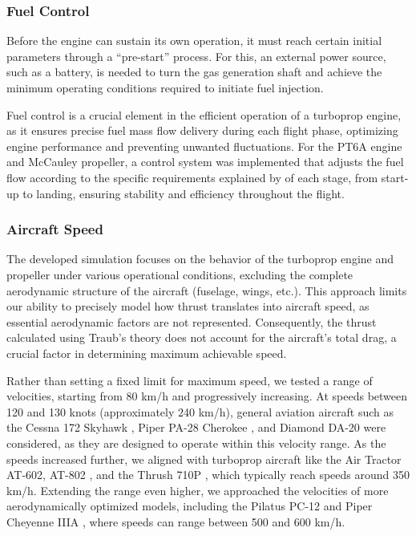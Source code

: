 \documentclass{Format}
\begin{document}
\subsubsection{Fuel Control}
    Before the engine can sustain its own operation, it must reach certain initial parameters through a “pre-start” process. For this, an external power source, such as a battery, is needed to turn the gas generation shaft and achieve the minimum operating conditions required to initiate fuel injection.
    
    Fuel control is a crucial element in the efficient operation of a turboprop engine, as it ensures precise fuel mass flow delivery during each flight phase, optimizing engine performance and preventing unwanted fluctuations. For the PT6A  engine and McCauley propeller, a control system was implemented that adjusts the fuel flow according to the specific requirements explained by \cite{vecchiio2024} of each stage, from start-up to landing, ensuring stability and efficiency throughout the flight.

\subsubsection{Aircraft Speed}
The developed simulation focuses on the behavior of the turboprop engine and propeller under various operational conditions, excluding the complete aerodynamic structure of the aircraft (fuselage, wings, etc.). This approach limits our ability to precisely model how thrust translates into aircraft speed, as essential aerodynamic factors are not represented. Consequently, the thrust calculated using Traub’s theory \cite{traub2016} does not account for the aircraft’s total drag, a crucial factor in determining maximum achievable speed.

Rather than setting a fixed limit for maximum speed, we tested a range of velocities, starting from 80 km/h and progressively increasing. At speeds between 120 and 130 knots (approximately 240 km/h), general aviation aircraft such as the Cessna 172 Skyhawk \cite{cessna_skyhawk_2024}, Piper PA-28 Cherokee \cite{piper_cherokee_2021}, and Diamond DA-20 \cite{diamond_da20_2024} were considered, as they are designed to operate within this velocity range. As the speeds increased further, we aligned with turboprop aircraft like the Air Tractor AT-602, AT-802 \cite{airtractor6022024,airtractor802a2024}, and the Thrush 710P \cite{thrush710p2024}, which typically reach speeds around 350 km/h. Extending the range even higher, we approached the velocities of more aerodynamically optimized models, including the Pilatus PC-12 \cite{pilatus2016} and Piper Cheyenne IIIA \cite{piper2016}, where speeds can range between 500 and 600 km/h.
\end{document}
